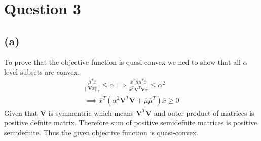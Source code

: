 \documentclass{article}
\begin{document}
\section*{\hfil Question 3}
\subsection*{(a)}
To prove that the objective function is quasi-convex we ned to show that all $\alpha$ level subsets are convex.
	\begin{gather*}
		\frac{\overline{\mu}^T\overline{x}}{||\mathbf{V}\overline{x}||_2} \le \alpha \implies \frac{\overline{x}^T\overline{\mu}\overline{\mu}^T\overline{x}}{\overline{x}^T\mathbf{V}^T\mathbf{V}\overline{x}} \le \alpha ^2\\
		\implies \overline{x}^T\left(\alpha ^2\mathbf{V}^T\mathbf{V} + \overline{\mu}\overline{\mu}^T\right)\overline{x} \ge 0
	\end{gather*}
	Given that $\mathbf{V}$ is symmentric which means $\mathbf{V}^T\mathbf{V}$ and  outer product of matrices is positive defnite matrix. Therefore sum of positive semidefnite matrices is positive semidefnite. Thus the given objective function is quasi-convex.
\end{document}
